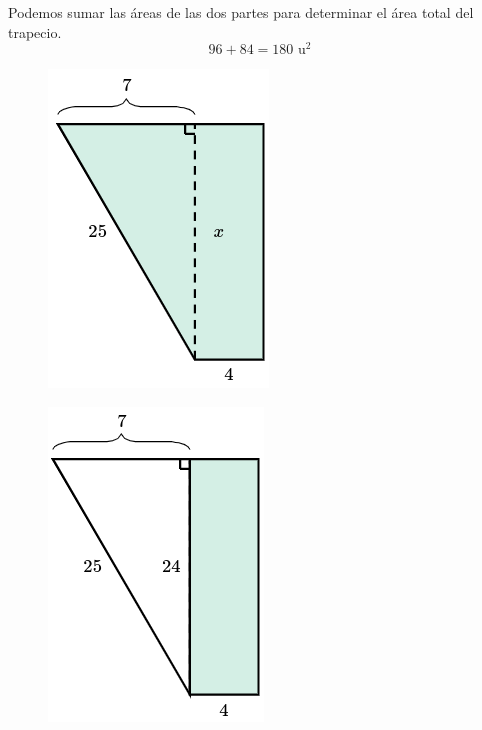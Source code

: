 \begin{solutionbox}{15cm}
\begin{minipage}{0.7\textwidth}
        Podemos sumar las áreas de las dos partes para determinar el área total del trapecio.
        \[96+84=180 \text{ u}^2\]
    \end{minipage}\hfill
    \begin{minipage}{0.25\textwidth}
        \begin{figure}[H]
            \centering
            \includegraphics[width=0.5\linewidth]{../images/area_compuesta_05a.png}
            \caption{}
            \label{fig:area_compuesta_05a}
        \end{figure}
        \begin{figure}[H]
            \centering
            \includegraphics[width=0.5\linewidth]{../images/area_compuesta_05b.png}
            \caption{}
            \label{fig:area_compuesta_05b}

\end{figure}
\end{minipage}
\end{solutionbox}
